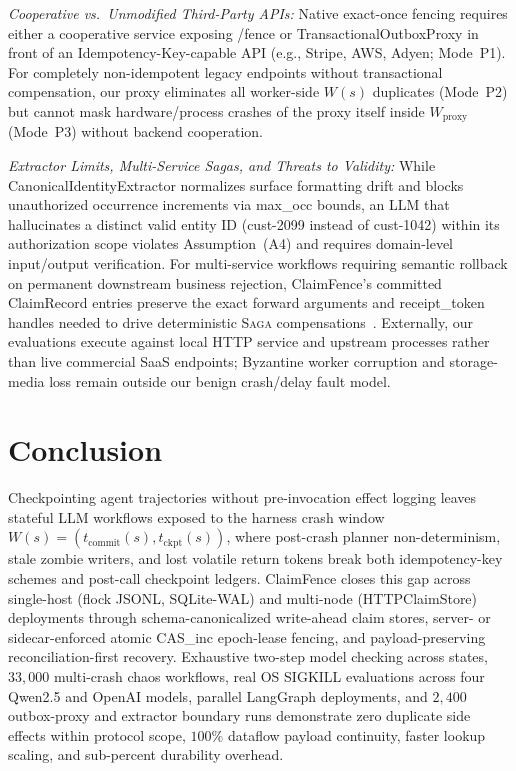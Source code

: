 \documentclass[10pt,journal]{IEEEtran}
\def\CF{ClaimFence}%
\def\texttt#1{#1}%
\theoremstyle{definition}
\theoremstyle{remark}
\newcommand{\CF}{\textsc{ClaimFence}}
\begin{document}
\emph{Cooperative vs.\ Unmodified Third-Party APIs:} Native exact-once fencing requires either a cooperative service exposing \texttt{/fence} or \texttt{TransactionalOutboxProxy} in front of an \texttt{Idempotency-Key}-capable API (e.g., Stripe, AWS, Adyen; Mode~P1). For completely non-idempotent legacy endpoints without transactional compensation, our proxy eliminates all worker-side $W(s)$ duplicates (Mode~P2) but cannot mask hardware/process crashes of the proxy itself inside $W_{\mathrm{proxy}}$ (Mode~P3) without backend cooperation.

\emph{Extractor Limits, Multi-Service Sagas, and Threats to Validity:} While \texttt{CanonicalIdentityExtractor} normalizes surface formatting drift and blocks unauthorized \texttt{occurrence} increments via \texttt{max\_occ} bounds, an LLM that hallucinates a distinct valid entity ID (\texttt{cust-2099} instead of \texttt{cust-1042}) within its authorization scope violates Assumption~(A4) and requires domain-level input/output verification. For multi-service workflows requiring semantic rollback on permanent downstream business rejection, \CF{}'s committed \texttt{ClaimRecord} entries preserve the exact forward arguments and \texttt{receipt\_token} handles needed to drive deterministic \textsc{Saga} compensations~\cite{garciamolina1987sagas,chang2025sagallm}. Externally, our evaluations execute against local HTTP service and upstream processes rather than live commercial SaaS endpoints; Byzantine worker corruption and storage-media loss remain outside our benign crash/delay fault model.

\section{Conclusion}\label{sec:conclusion}

Checkpointing agent trajectories without pre-invocation effect logging leaves stateful LLM workflows exposed to the harness crash window $W(s) = (t_{\mathrm{commit}}(s), t_{\mathrm{ckpt}}(s))$, where post-crash planner non-determinism, stale zombie writers, and lost volatile return tokens break both idempotency-key schemes and post-call checkpoint ledgers. \CF{} closes this gap across single-host (\texttt{flock} JSONL, \texttt{SQLite-WAL}) and multi-node (\texttt{HTTPClaimStore}) deployments through schema-canonicalized write-ahead claim stores, server- or sidecar-enforced atomic \texttt{CAS\_inc} epoch-lease fencing, and payload-preserving reconciliation-first recovery. Exhaustive two-step model checking across \MCCFStates{} states, $33{,}000$ multi-crash chaos workflows, real OS \texttt{SIGKILL} evaluations across four \texttt{Qwen2.5} and \texttt{OpenAI} models, parallel \texttt{LangGraph} deployments, and $2{,}400$ outbox-proxy and extractor boundary runs demonstrate zero duplicate side effects within protocol scope, $100\%$ dataflow payload continuity, \ScaleTenKSpeedup{} faster lookup scaling, and sub-percent durability overhead.
\end{document}
